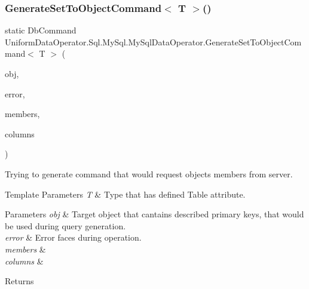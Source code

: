 \subsubsection{\texorpdfstring{Generate\+Set\+To\+Object\+Command$<$ T $>$()}{GenerateSetToObjectCommand< T >()}}
{\footnotesize\ttfamily static Db\+Command Uniform\+Data\+Operator.\+Sql.\+My\+Sql.\+My\+Sql\+Data\+Operator.\+Generate\+Set\+To\+Object\+Command$<$ T $>$ (\begin{DoxyParamCaption}\item[{object}]{obj,  }\item[{out string}]{error,  }\item[{out List$<$ Member\+Info $>$}]{members,  }\item[{params string \mbox{[}$\,$\mbox{]}}]{columns }\end{DoxyParamCaption})\hspace{0.3cm}{\ttfamily [static]}}



Trying to generate command that would request objects members from server. 


\begin{DoxyTemplParams}{Template Parameters}
{\em T} & Type that has defined Table attribute. 
\begin{DoxyParams}{Parameters}
{\em obj} & Target object that cantains described primary keys, that would be used during query generation.\\
\hline
{\em error} & Error faces during operation.\\
\hline
{\em members} & \\
\hline
{\em columns} & \\
\hline
\end{DoxyParams}
\begin{DoxyReturn}{Returns}

\end{DoxyReturn}
\\
\hline
\end{DoxyTemplParams}
\mbox{\label{class_uniform_data_operator_1_1_sql_1_1_my_sql_1_1_my_sql_data_operator_aafd50d73bfdb7cebf3631b2ecac36b80}} 
